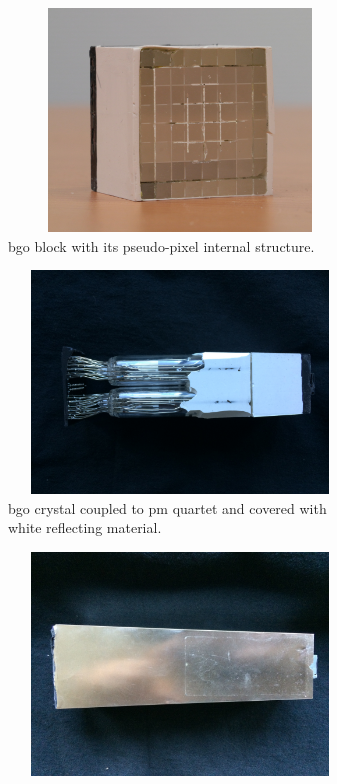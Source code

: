 \begin{figure}
\begin{subfigure}[t]{.5\textwidth}
\centering
\includegraphics[width=1\textwidth, height=16em]{03_GraphicFiles/chapter3_CLaRySproto/Absorber/images/block_noPM}
\caption{\gls{bgo} block with its pseudo-pixel internal structure.}
\label{chap3::fig::block_noPM}
\end{subfigure}
\begin{subfigure}[t]{.5\textwidth}
\centering
\includegraphics[width=1\textwidth, height=16em]{03_GraphicFiles/chapter3_CLaRySproto/Absorber/images/originalBlock_noAluminum}
\caption{\gls{bgo} crystal coupled to \gls{pm} quartet and covered with white reflecting material.}
\label{chap3::fig::originalBlock_noAl}
\end{subfigure}\newline
\begin{subfigure}[t]{.5\textwidth}
\centering
\includegraphics[width=1\textwidth, height=16em]{03_GraphicFiles/chapter3_CLaRySproto/Absorber/images/originalBlock_withAluminum}

\end{subfigure}
\end{figure}
